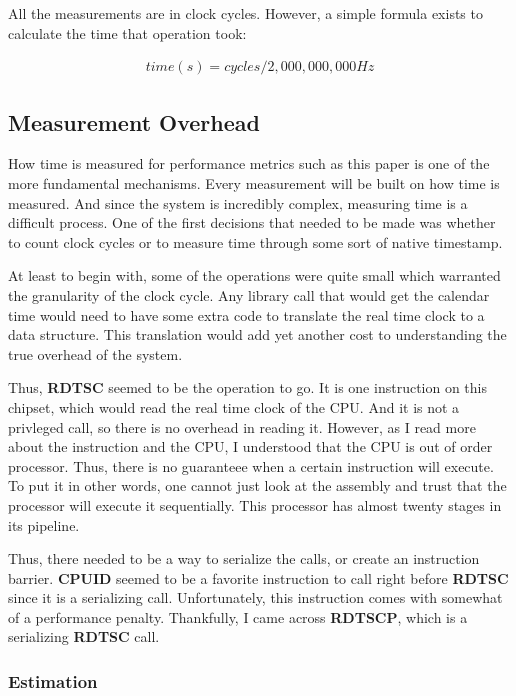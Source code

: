 \documentclass[paper=a4, fontsize=11pt]{scrartcl}
\numberwithin{equation}{section}        %
\numberwithin{figure}{section}          %
\numberwithin{table}{section}               %
\begin{document}
All the measurements are in clock cycles.  However, a simple formula exists to calculate the time that operation took:

\begin{gather}
time(s)=cycles/2,000,000,000 Hz
\end{gather}

\subsection{Measurement Overhead}

How time is measured for performance metrics such as this paper is one of the more fundamental mechanisms.  Every measurement will be built on how time is measured.  And since the system is incredibly complex, measuring time is a difficult process.  One of the first decisions that needed to be made was whether to count clock cycles or to measure time through some sort of native timestamp.

At least to begin with, some of the operations were quite small which warranted the granularity of the clock cycle.  Any library call that would get the calendar time would need to have some extra code to translate the real time clock to a data structure.  This translation would add yet another cost to understanding the true overhead of the system.

Thus, \textbf{RDTSC} seemed to be the operation to go.  It is one instruction on this chipset, which would read the real time clock of the CPU.  And it is not a privleged call, so there is no overhead in reading it.  However, as I read more about the instruction and the CPU, I understood that the CPU is out of order processor.  Thus, there is no guaranteee when a certain instruction will execute.  To put it in other words, one cannot just look at the assembly and trust that the processor will execute it sequentially.  This processor has almost twenty stages in its pipeline.

Thus, there needed to be a way to serialize the calls, or create an instruction barrier.  \textbf{CPUID} seemed to be a favorite instruction to call right before \textbf{RDTSC} since it is a serializing call.  Unfortunately, this instruction comes with somewhat of a performance penalty.  Thankfully, I came across \textbf{RDTSCP}, which is a serializing \textbf{RDTSC} call.

\subsubsection{Estimation}
\end{document}
